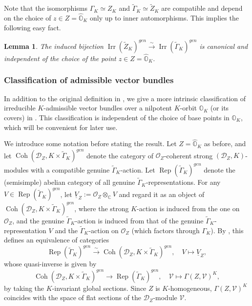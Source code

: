 \documentclass[11pt, a4paper]{amsart}
\newcommand{\C}{\mathbb{C}}
\newcommand{\orb}{\mathbb{O}}
\newcommand{\orbk}{\orb_{K}}
\newcommand{\horbk}{\widehat{\orb}_{K}}
\newcommand{\cV}{\mathcal{V}}
\newcommand{\sD}{\mathscr{D}}
\newcommand{\tGamma}{\widetilde{\Gamma}}
\DeclareMathOperator{\Rep}{Rep}
\DeclareMathOperator{\Coh}{Coh}
\newcommand{\OO}{\mathcal{O}}
\newcommand{\Irr}{\operatorname{Irr}}
\newtheorem{Lem}[Thm]{Lemma}
\theoremstyle{definition}
\numberwithin{equation}{section}
\begin{document}
Note that the isomorphisms $\Gamma_K \simeq Z_K$ and $\tGamma_K \simeq \widetilde{Z}_K$ are compatible and depend on the choice of $z \in Z=\horbk$ only up to inner automorphisms. %
This implies the following easy fact.

\begin{Lem} \label{lem:bij_irr_gen}
    The induced bijection $\Irr(\widetilde{Z}_K)^{gen} \xrightarrow{\sim} \Irr(\tGamma_K)^{gen}$ is canonical and independent of the choice of the point $z \in Z = \horbk$.
\end{Lem}


\subsubsection{Classification of admissible vector bundles} \label{subsubsec:classification_adm_vb}

In addition to the original definition in , we give a more intrinsic classification of irreducible $K$-admissible vector bundles over a nilpotent $K$-orbit $\orbk$ (or its covers) in . This classification is independent of the choice of base points in $\orbk$, which will be convenient for later use.

We introduce some notation before stating the result. Let $Z = \horbk$ as before, and let $\Coh(\sD_Z, K \times \tGamma_K)^{gen}$ denote the category of $\OO_Z$-coherent strong $(\sD_Z, K)$-modules with a compatible genuine $\tGamma_K$-action.
Let $\Rep(\tGamma_K)^{gen}$ denote the (semisimple) abelian category of all genuine $\tGamma_K$-representations.
For any $V \in \Rep(\tGamma_K)^{gen}$, let $\underline{V}_Z := \OO_Z \otimes_\C V$ and regard it as an object of $\Coh(\sD_Z, K \times \tGamma_K)^{gen}$, where the strong $K$-action is induced from the one on $\OO_Z$, and the genuine $\tGamma_K$-action is induced from that of the genuine $\tGamma_K$-representation $V$ and the $\tGamma_K$-action on $\OO_Z$ (which factors through $\Gamma_K$). By \cite[Lemma 2.7]{Yu:period}, this defines an equivalence of categories
\begin{equation} \label{eq:equiv_underline_V}
	\Rep(\tGamma_K)^{gen} \xrightarrow{\,\sim\,} \Coh(\sD_Z, K \times \tGamma_K)^{gen}, \quad V \mapsto \underline{V}_Z,
\end{equation}
whose quasi-inverse is given by 
\begin{equation} \label{eq:equiv_underline_V_inverse}
	\Coh(\sD_Z, K \times \tGamma_K)^{gen} \to \Rep(\tGamma_K)^{gen}, \quad \cV \mapsto \Gamma(Z, \cV)^K,
\end{equation}
by taking the $K$-invariant global sections. Since $Z$ is $K$-homogeneous, $\Gamma(Z, \cV)^K$ coincides with the space of flat sections of the $\sD_Z$-module $\cV$.
\end{document}
